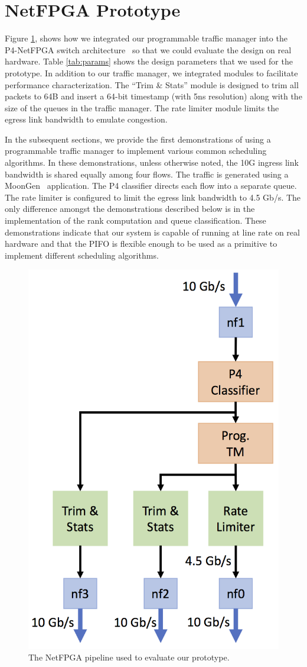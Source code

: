 \section{NetFPGA Prototype}

Figure \ref{fig:proto_arch}, shows how we integrated our programmable traffic manager into the P4-NetFPGA switch architecture~\cite{P4-NetFPGA} so that we could evaluate the design on real hardware. Table \ref{tab:params} shows the design parameters that we used for the prototype. In addition to our traffic manager, we integrated modules to facilitate performance characterization. The ``Trim \& Stats'' module is designed to trim all packets to 64B and insert a 64-bit timestamp (with 5ns resolution) along with the size of the queues in the traffic manager. The rate limiter module limits the egress link bandwidth to emulate congestion.

In the subsequent sections, we provide the first demonstrations of using a programmable traffic manager to implement various common scheduling algorithms. In these demonstrations, unless otherwise noted, the 10G ingress link bandwidth is shared equally among four flows. The traffic is generated using a MoonGen~\cite{moongen} application. The P4 classifier directs each flow into a separate queue. The rate limiter is configured to limit the egress link bandwidth to 4.5 Gb/s. The only difference amongst the demonstrations described below is in the implementation of the rank computation and queue classification. These demonstrations indicate that our system is capable of running at line rate on real hardware and that the PIFO is flexible enough to be used as a primitive to implement different scheduling algorithms.


\begin{figure}[!ht]
\includegraphics[width=0.7\linewidth]{figures/design/prototype_arch}
\caption{The NetFPGA pipeline used to evaluate our prototype.}
\label{fig:proto_arch}
\end{figure}

